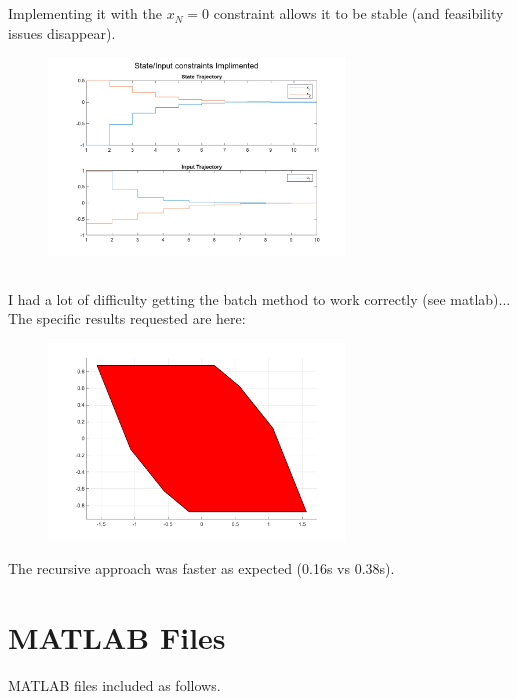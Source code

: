 \documentclass[]{article}
\begin{document}
\newpage
\subsection{}
Implementing it with the $x_N = 0$ constraint allows it to be stable (and feasibility issues disappear).
\begin{figure}[h]
    \centering
    \includegraphics[width=0.7\textwidth]{figs/pblm2c}
\end{figure}

\newpage
\subsection{}
I had a lot of difficulty getting the batch method to work correctly (see matlab)...
The specific results requested are here:
\begin{figure}[h]
    \centering
    \includegraphics[width=0.7\textwidth]{figs/pblm2d.png}
\end{figure}

The recursive approach was faster as expected (0.16s vs 0.38s).


\newpage
\appendix
\section{MATLAB Files}
MATLAB files included as follows.
% 


\end{document}
